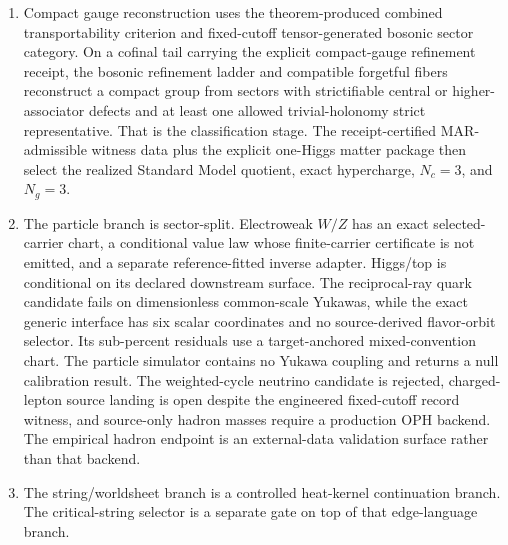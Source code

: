 \begin{enumerate}[leftmargin=2em]
\(N_{\mathrm{CRC}}=F(N_{\mathrm{CRC}})\) and fixes the dimensionless relation
\(\Lambda_{\mathrm{CRC}}\ell_\star^2=3\pi/N_{\mathrm{CRC}}\) on the same Einstein branch. Once the
selected scale certificate supplies \(G_{\mathrm{geom}}=\ell_\star^2\), this is the familiar display
\(\Lambda_{\mathrm{CRC}}=3\pi/(G_{\mathrm{geom}}N_{\mathrm{CRC}})\). Its count-density
representation is the declared count-density selector
\(N_\star=\arg\max_N(\log|\Omega^{\mathrm{sc}}_N|-N)\), which consumes a smoothness/interior-maximum
assumption on \(N\) that the MAR lexicographic order on sector packages does not license. On the
observed branch the selector is targeted at the de Sitter entropy capacity; the count
\(|\Omega^{\mathrm{sc}}_N|\) has no constructed content, and the working capacity value is a
measured-side input.
\item Compact gauge reconstruction uses the theorem-produced combined transportability criterion and fixed-cutoff tensor-generated bosonic sector category. On a cofinal tail carrying the explicit compact-gauge refinement receipt, the bosonic refinement ladder and compatible forgetful fibers reconstruct a compact group from sectors with strictifiable central or higher-associator defects and at least one allowed trivial-holonomy strict representative. That is the classification stage. The receipt-certified MAR-admissible witness data plus the explicit one-Higgs matter package then select the realized Standard Model quotient, exact hypercharge, \(N_c=3\), and \(N_g=3\).
\item The particle branch is sector-split. Electroweak \(W/Z\) has an exact selected-carrier chart, a conditional value law whose finite-carrier certificate is not emitted, and a separate reference-fitted inverse adapter. Higgs/top is conditional on its declared downstream surface. The reciprocal-ray quark candidate fails on dimensionless common-scale Yukawas, while the exact generic interface has six scalar coordinates and no source-derived flavor-orbit selector. Its sub-percent residuals use a target-anchored mixed-convention chart. The particle simulator contains no Yukawa coupling and returns a null calibration result. The weighted-cycle neutrino candidate is rejected, charged-lepton source landing is open despite the engineered fixed-cutoff record witness, and source-only hadron masses require a production OPH backend. The empirical hadron endpoint is an external-data validation surface rather than that backend.
\item The string/worldsheet branch is a controlled heat-kernel continuation branch. The critical-string selector is a separate gate on top of that edge-language branch.
\end{enumerate}

